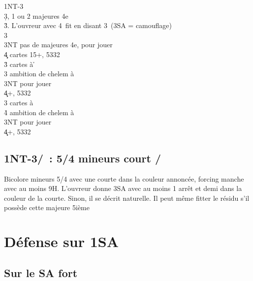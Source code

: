 \documentclass[a4paper]{article}
\begin{document}
\begin{bidtable}
1NT-3\c\\
3\d {}, 1 ou 2 majeures 4e\+\\
3\h {}\s . L'ouvreur avec 4\s\ fit en disant 3\s\ (3SA = camouflage)\\
3\s {}\h \\
3NT \> pas de majeures 4e, pour jouer\\
4\c\d {} cartes 15+, 5332\-\\
3\h {} cartes à \h \+\\
3\s \> ambition de chelem à \h \\
3NT \> pour jouer\\
4\c\d {}+, 5332\-\\
3\s {} cartes à \s \+\\
4\h \> ambition de chelem à \s \\
3NT \> pour jouer\\
4\c\d {}+, 5332\-
\end{bidtable}

\subsection{1NT-3\pdfh/\pdfs\ : 5/4 mineurs court \pdfh/\pdfs}

Bicolore mineurs 5/4 avec une courte dans la couleur annoncée, forcing manche avec au 
moins 9H. L’ouvreur donne 3SA avec au moins 1 arrêt et demi dans la couleur de la courte.
Sinon, il se décrit naturelle. Il peut même fitter le résidu s’il possède cette majeure 5ième

\section{Défense sur 1SA}

\subsection{Sur le SA fort}
\end{document}
